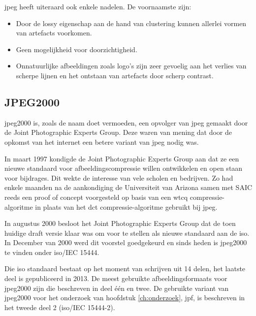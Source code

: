 \Gls{jpeg} heeft uiteraard ook enkele nadelen. De voornaamste zijn:

\begin{itemize}
	\item Door de \gls{lossy} eigenschap aan de hand van clustering kunnen allerlei vormen van \glspl{artefact} voorkomen.
	
	\item Geen mogelijkheid voor doorzichtigheid.
	
	\item Onnatuurlijke afbeeldingen zoals logo's zijn zeer gevoelig aan het verlies van scherpe lijnen en het ontstaan van \glspl{artefact} door scherp contrast.
\end{itemize}

\subsection{JPEG2000}
\label{sec:afbeeldingscompressie-jpeg2000}

\Gls{jpeg2000} is, zoals de naam doet vermoeden, een opvolger van \gls{jpeg} gemaakt door de Joint Photographic Experts Group. Deze waren van mening dat door de opkomst van het internet een betere variant van \gls{jpeg} nodig was.

In maart 1997 kondigde de Joint Photographic Experts Group aan dat ze een nieuwe standaard voor afbeeldingscompressie willen ontwikkelen en open staan voor bijdrages. Dit wekte de interesse van vele scholen en bedrijven. Zo had enkele maanden na de aankondiging de Universiteit van Arizona samen met SAIC reeds een proof of concept voorgesteld op basis van een \gls{wtcq} \gls{compressie-algoritme} in plaats van het \gls{dct} \gls{compressie-algoritme} gebruikt bij \gls{jpeg}.

In augustus 2000 besloot het Joint Photographic Experts Group dat de toen huidige draft versie klaar was om voor te stellen als nieuwe standaard aan de \gls{iso}. In December van 2000 werd dit voorstel goedgekeurd en sinds heden is  \gls{jpeg2000} te vinden onder \gls{iso}/IEC 15444. 

Die \gls{iso} standaard bestaat op het moment van schrijven uit 14 delen, het laatste deel is gepubliceerd in 2013. De meest gebruikte \glspl{afbeeldingsformaat} voor \gls{jpeg2000} zijn die beschreven in deel één en twee. De gebruikte variant van \gls{jpeg2000} voor het onderzoek van hoofdstuk \ref{ch:onderzoek}, \gls{jpf}, is beschreven in het tweede deel 2 (\gls{iso}/IEC 15444-2).


